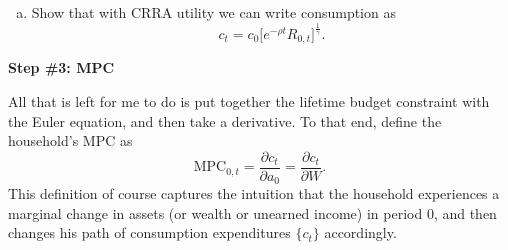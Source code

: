 \documentclass[11pt]{extarticle}
\theoremstyle{plain}
\theoremstyle{definition}
\begin{document}
\begin{enumerate}[(a)]
\item Show that with CRRA utility we can write consumption as 
\begin{equation*}
	c_t = c_0 \bigg[ e^{- \rho t} R_{0,t} \bigg]^\frac{1}{\gamma} .
\end{equation*}


\end{enumerate}

\vspace{5mm}
\noindent
\textbf{Step \#3: MPC}



\vspace{3mm}
\noindent
All that is left for me to do is put together the lifetime budget constraint with the Euler equation, and then take a derivative. To that end, define the household's MPC as 
\begin{equation*}
	\text{MPC}_{0,t} = \frac{\partial c_t}{\partial a_0} = \frac{\partial c_t}{\partial W}.
\end{equation*}
This definition of course captures the intuition that the household experiences a marginal change in assets (or wealth or unearned income) in period $0$, and then changes his path of consumption expenditures $\{ c_t\}$ accordingly. 
\end{document}

